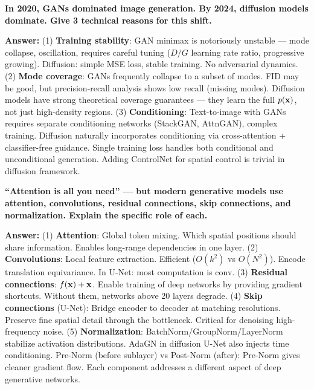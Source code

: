 \begin{examq}
\textbf{In 2020, GANs dominated image generation. By 2024, diffusion models dominate. Give 3 technical reasons for this shift.}

\textbf{Answer:} (1) \textbf{Training stability}: GAN minimax is notoriously unstable — mode collapse, oscillation, requires careful tuning ($D/G$ learning rate ratio, progressive growing). Diffusion: simple MSE loss, stable training. No adversarial dynamics. (2) \textbf{Mode coverage}: GANs frequently collapse to a subset of modes. FID may be good, but precision-recall analysis shows low recall (missing modes). Diffusion models have strong theoretical coverage guarantees — they learn the full $p(\mathbf{x})$, not just high-density regions. (3) \textbf{Conditioning}: Text-to-image with GANs requires separate conditioning networks (StackGAN, AttnGAN), complex training. Diffusion naturally incorporates conditioning via cross-attention + classifier-free guidance. Single training loss handles both conditional and unconditional generation. Adding ControlNet for spatial control is trivial in diffusion framework.
\end{examq}

\begin{examq}
\textbf{``Attention is all you need'' — but modern generative models use attention, convolutions, residual connections, skip connections, and normalization. Explain the specific role of each.}

\textbf{Answer:} (1) \textbf{Attention}: Global token mixing. Which spatial positions should share information. Enables long-range dependencies in one layer. (2) \textbf{Convolutions}: Local feature extraction. Efficient ($O(k^2)$ vs $O(N^2)$). Encode translation equivariance. In U-Net: most computation is conv. (3) \textbf{Residual connections}: $f(\mathbf{x}) + \mathbf{x}$. Enable training of deep networks by providing gradient shortcuts. Without them, networks above 20 layers degrade. (4) \textbf{Skip connections} (U-Net): Bridge encoder to decoder at matching resolutions. Preserve fine spatial detail through the bottleneck. Critical for denoising high-frequency noise. (5) \textbf{Normalization}: BatchNorm/GroupNorm/LayerNorm stabilize activation distributions. AdaGN in diffusion U-Net also injects time conditioning. Pre-Norm (before sublayer) vs Post-Norm (after): Pre-Norm gives cleaner gradient flow. Each component addresses a different aspect of deep generative networks.
\end{examq}

